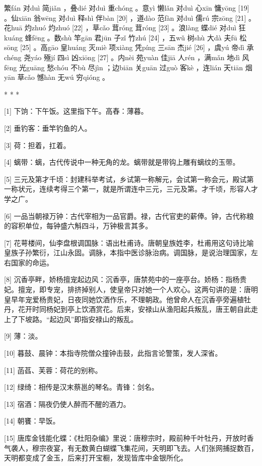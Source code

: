 \documentclass[12pt,UTF8]{ctexbook}
\begin{document}
繁fán 对duì 简jiǎn ，叠dié 对duì 重chóng 。意yì 懒lǎn 对duì 心xīn 慵yōng [19] 。仙xiān 翁wēng 对duì 释shì 伴bàn [20] ，道dào 范fàn 对duì 儒rú 宗zōng [21] 。花huā 灼zhuó 灼zhuó [22] ，草cǎo 茸róng 茸róng [23] 。浪làng 蝶dié 对duì 狂kuáng 蜂fēng 。数shù 竿gān 君jūn 子zǐ 竹zhú [24] ，五wǔ 树shù 大dà 夫fū 松sōng [25] 。高gāo 皇huáng 灭miè 项xiàng 凭píng 三sān 杰jié [26] ，虞yú 帝dì 承chéng 尧yáo 殛jí 四sì 凶xiōng [27] 。内nèi 苑yuàn 佳jiā 人rén ，满mǎn 地dì 风fēng 光guāng 愁chóu 不bù 尽jìn ；边biān 关guān 过guò 客kè ，连lián 天tiān 烟yān 草cǎo 憾hàn 无wú 穷qióng 。



* * *



[1] 下饷：下午饭。这里指下午。高舂：薄暮。

[2] 垂钓客：垂竿钓鱼的人。

[3] 荷：担着，扛着。

[4] 螭带：螭，古代传说中一种无角的龙。螭带就是带钩上雕有螭纹的玉带。

[5] 三元及第才千顷：封建科举考试，乡试第一称解元，会试第一称会元，殿试第一称状元，连续考得三个第一，就是所谓连中三元，三元及第。才千顷，形容人才学之广。

[6] 一品当朝禄万钟：古代宰相为一品官爵。禄，古代官吏的薪俸。钟，古代称粮的容积单位，每钟盛六斛四斗，万钟极言其多。

[7] 花萼楼间，仙李盘根调国脉：语出杜甫诗。唐朝皇族姓李，杜甫用这句诗比喻皇族子孙繁衍，江山永固。调脉，本指中医诊脉治病。调国脉，是说治理国家，左右国家的命运。

[8] 沉香亭畔，娇杨擅宠起边风：沉香亭，唐禁苑中的一座亭台。娇杨：指杨贵妃。擅宠，即专宠，排挤掉别人，使皇帝只对她一个人欢心。这两句讲的是：唐明皇早年宠爱杨贵妃，日夜同她饮酒作乐，不理朝政。他曾命人在沉香亭旁遍植牡丹，花开时同杨妃到亭上饮酒赏花。后来，安禄山从渔阳起兵叛乱，唐王朝自此走上了下坡路。“起边风”即指安禄山的叛乱。

[9] 薄：淡。

[10] 暮鼓、晨钟：本指寺院僧众撞钟击鼓，此指言论警策，发人深省。

[11] 菡萏、芙蓉：荷花的别称。

[12] 绿绮：相传是汉末蔡邕的琴名。青锋：剑名。

[13] 宿酒：隔夜仍使人醉而不醒的酒力。

[14] 朝饔：早饭。

[15] 唐库金钱能化蝶：《杜阳杂编》里说：唐穆宗时，殿前种千叶牡丹，开放时香气袭人，穆宗夜宴，有无数黄白蝴蝶飞集花间，天明即飞去。人们张网捕捉数百，天明都变成了金玉，后来打开宝橱，发现皆库中金银所化。
\end{document}
